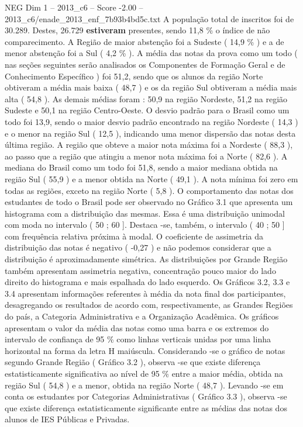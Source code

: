 \begin{textsample}{NEG Dim 1 – 2013\_c6 – Score -2.00 – 2013\_c6/enade\_2013\_enf\_7b93b4bd5c.txt}
A população total de inscritos foi de 30.289.
Destes, 26.729 \textbf{estiveram} presentes, sendo 11,8 \% o índice de não comparecimento.
A Região de maior abstenção foi a Sudeste ( 14,9 \% ) e a de menor abstenção foi a Sul ( 4,2 \% ).
A média das notas da prova como um todo ( nas seções seguintes serão analisados os Componentes de Formação Geral e de Conhecimento Específico ) foi 51,2, sendo que os alunos da região Norte obtiveram a média mais baixa ( 48,7 ) e os da região Sul obtiveram a média mais alta ( 54,8 ).
As demais médias foram : 50,9 na região Nordeste, 51,2 na região Sudeste e 50,1 na região Centro-Oeste.
O desvio padrão para o Brasil como um todo foi 13,9, sendo o maior desvio padrão encontrado na região Nordeste ( 14,3 ) e o menor na região Sul ( 12,5 ), indicando uma menor dispersão das notas desta última região.
A região que obteve a maior nota máxima foi a Nordeste ( 88,3 ), ao passo que a região que atingiu a menor nota máxima foi a Norte ( 82,6 ).
A mediana do Brasil como um todo foi 51,8, sendo a maior mediana obtida na região Sul ( 55,9 ) e a menor obtida na Norte ( 49,1 ).
A nota mínima foi zero em todas as regiões, exceto na região Norte ( 5,8 ).
O comportamento das notas dos estudantes de todo o Brasil pode ser observado no Gráfico 3.1 que apresenta um histograma com a distribuição das mesmas.
Essa é uma distribuição unimodal com moda no intervalo ( 50 ; 60 ].
Destaca -se, também, o intervalo ( 40 ; 50 ] com frequência relativa próxima à modal.
O coeficiente de assimetria da distribuição das notas é negativo ( -0,27 ) e não podemos considerar que a distribuição é aproximadamente simétrica.
As distribuições por Grande Região também apresentam assimetria negativa, concentração pouco maior do lado direito do histograma e mais espalhada do lado esquerdo.
Os Gráficos 3.2, 3.3 e 3.4 apresentam informações referentes à média da nota final dos participantes, desagregando os resultados de acordo com, respectivamente, as Grandes Regiões do país, a Categoria Administrativa e a Organização Acadêmica.
Os gráficos apresentam o valor da média das notas como uma barra e os extremos do intervalo de confiança de 95 \% como linhas verticais unidas por uma linha horizontal na forma da letra H maiúscula.
Considerando -se o gráfico de notas segundo Grande Região ( Gráfico 3.2 ), observa -se que existe diferença estatisticamente significativa ao nível de 95 \% entre a maior média, obtida na região Sul ( 54,8 ) e a menor, obtida na região Norte ( 48,7 ).
Levando -se em conta os estudantes por Categorias Administrativas ( Gráfico 3.3 ), observa -se que existe diferença estatisticamente significante entre as médias das notas dos alunos de IES Públicas e Privadas.

\end{textsample}
